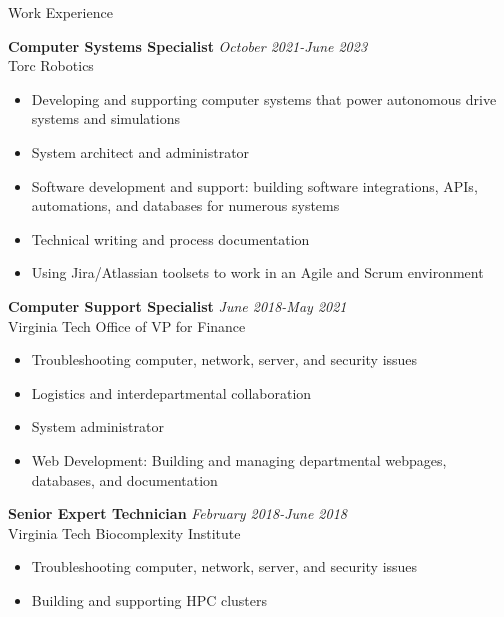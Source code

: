 \documentclass{resume} %
\begin{document}
\begin{rSection}{Work Experience}

\textbf{Computer Systems Specialist} \hfill \textit{October 2021-June 2023} \\
Torc Robotics
 \begin{itemize}
    \itemsep -3pt {} 
     \item Developing and supporting computer systems that power autonomous drive systems and simulations
     \item System architect and administrator
     \item Software development and support: building software integrations, APIs, automations, and databases for numerous systems
     \item Technical writing and process documentation
     \item Using Jira/Atlassian toolsets to work in an Agile and Scrum environment
 \end{itemize}
 
\textbf{Computer Support Specialist} \hfill \textit{June 2018-May 2021} \\
Virginia Tech Office of VP for Finance
 \begin{itemize}
    \itemsep -3pt {} 
     \item Troubleshooting computer, network, server, and security issues
     \item Logistics and interdepartmental collaboration
     \item System administrator
     \item Web Development: Building and managing departmental webpages, databases, and documentation
 \end{itemize}

 \textbf{Senior Expert Technician} \hfill \textit{February 2018-June 2018} \\
 Virginia Tech Biocomplexity Institute
  \begin{itemize}
     \itemsep -3pt {} 
      \item Troubleshooting computer, network, server, and security issues
      \item Building and supporting HPC clusters
  \end{itemize}


\end{rSection}
\end{document}
